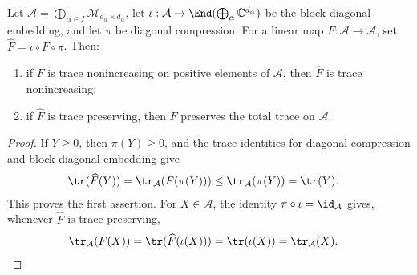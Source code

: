 \begin{lemma}
    \label{thm:direct_sum_extension_trace_transfer}
    \leanok

    Let
    $\mathcal A=\bigoplus_{\alpha\in I}\mathcal M_{d_\alpha\times d_\alpha}$,
    let $\iota:\mathcal A\to\End(\bigoplus_\alpha
        \mathbb C^{d_\alpha})$ be the block-diagonal embedding, and let $\pi$ be
    diagonal compression. For a linear map $F:\mathcal A\to\mathcal A$, set
    $\widehat F=\iota\circ F\circ\pi$. Then:
    \begin{enumerate}
        \item if $F$ is trace nonincreasing on positive elements of $\mathcal A$,
              then $\widehat F$ is trace nonincreasing;
        \item if $\widehat F$ is trace preserving, then $F$ preserves the total
              trace on $\mathcal A$.
    \end{enumerate}
\end{lemma}

\begin{proof}\leanok
    If $Y\geq0$, then $\pi(Y)\geq0$, and the trace identities for diagonal
    compression and block-diagonal embedding give
    \begin{align}
        \tr(\widehat F(Y))
         & =\tr_{\mathcal A}(F(\pi(Y)))
        \leq\tr_{\mathcal A}(\pi(Y))
        =\tr(Y).
        \notag
    \end{align}
    This proves the first assertion. For $X\in\mathcal A$, the identity
    $\pi\circ\iota=\id_{\mathcal A}$ gives, whenever $\widehat F$ is trace
    preserving,
    \begin{align}
        \tr_{\mathcal A}(F(X))
         & =\tr(\widehat F(\iota(X)))
        =\tr(\iota(X))
        =\tr_{\mathcal A}(X).
        \notag
    \end{align}
\end{proof}

